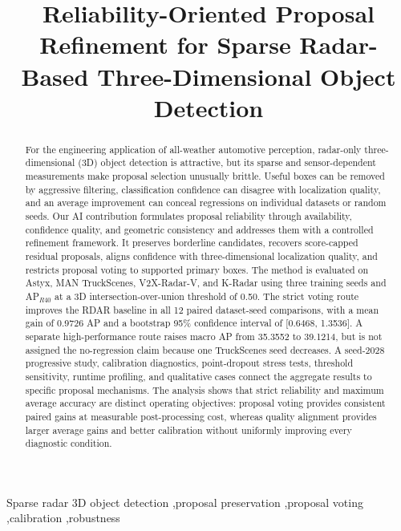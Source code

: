 \documentclass[final,5p,times]{elsarticle}
\begin{document}
\begin{frontmatter}

\title{Reliability-Oriented Proposal Refinement for Sparse Radar-Based
Three-Dimensional Object Detection}

\begin{abstract}
For the engineering application of all-weather automotive perception,
radar-only three-dimensional (3D) object detection is attractive, but
its sparse and sensor-dependent measurements make proposal selection
unusually brittle. Useful boxes can be removed by aggressive filtering,
classification confidence can disagree with localization quality, and an
average improvement can conceal regressions on individual datasets or random
seeds. Our AI contribution formulates proposal reliability through
availability, confidence quality, and geometric consistency and addresses
them with a controlled refinement framework. It preserves borderline
candidates, recovers
score-capped residual proposals, aligns confidence with three-dimensional
localization quality, and restricts proposal voting to supported primary
boxes. The method is
evaluated on Astyx, MAN TruckScenes, V2X-Radar-V, and K-Radar using three
training seeds and AP$_{R40}$ at a 3D intersection-over-union threshold of
0.50. The strict voting route improves the RDAR baseline in all 12 paired
dataset-seed comparisons, with a mean gain of 0.9726 AP and a bootstrap 95\%
confidence interval of [0.6468, 1.3536]. A separate high-performance route
raises macro AP from 35.3552 to 39.1214, but is not assigned the no-regression
claim because one TruckScenes seed decreases. A seed-2028 progressive study,
calibration diagnostics, point-dropout stress tests, threshold sensitivity,
runtime profiling, and qualitative cases connect the aggregate results to
specific proposal mechanisms. The analysis shows that strict reliability and
maximum average accuracy are distinct operating objectives: proposal voting
provides consistent paired gains at measurable post-processing cost, whereas
quality alignment provides larger average gains and better calibration without
uniformly improving every diagnostic condition.
\end{abstract}

\begin{keyword}
Sparse radar 3D object detection \sep proposal preservation \sep proposal voting \sep calibration \sep robustness
\end{keyword}

\end{frontmatter}
\end{document}
